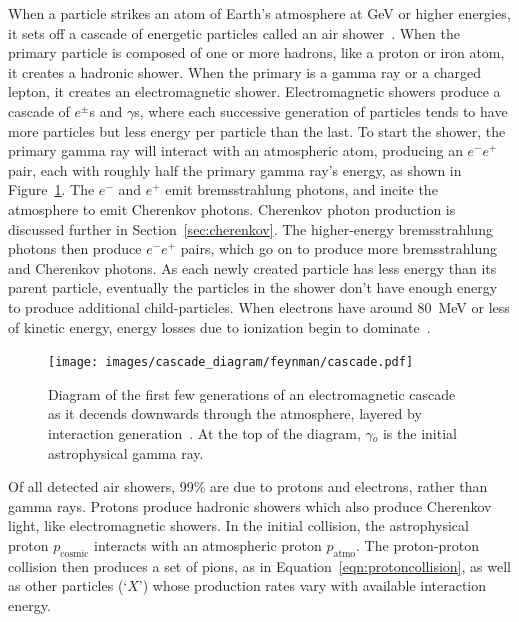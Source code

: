   When a particle strikes an atom of Earth's atmosphere at GeV or higher energies, it sets off a cascade of energetic particles called an air shower~\cite{Bethe1934,Klein1999}.
  When the primary particle is composed of one or more hadrons, like a proton or iron atom, it creates a hadronic shower.
  When the primary is a gamma ray or a charged lepton, it creates an electromagnetic shower.
  Electromagnetic showers produce a cascade of $e^{\pm}$s and $\gamma$s, where each successive generation of particles tends to have more particles but less energy per particle than the last.
  To start the shower, the primary gamma ray will interact with an atmospheric atom, producing an $e^{-}e^{+}$ pair, each with roughly half the primary gamma ray's energy, as shown in Figure~\ref{fig:emcascade}.
  The $e^{-}$ and $e^{+}$ emit bremsstrahlung photons, and incite the atmosphere to emit Cherenkov photons.
  Cherenkov photon production is discussed further in Section~\ref{sec:cherenkov}.
  The higher-energy bremsstrahlung photons then produce $e^{-}e^{+}$ pairs, which go on to produce more bremsstrahlung and Cherenkov photons.
  As each newly created particle has less energy than its parent particle, eventually the particles in the shower don't have enough energy to produce additional child-particles.
  When electrons have around \SI{80}{MeV} or less of kinetic energy, energy losses due to ionization begin to dominate~\cite{pdg_2014}.

  \begin{figure}[ht]
    \centering
    \texttt{[image: images/cascade\_diagram/feynman/cascade.pdf]}
    \caption[Electromagnetic Cascade]{
      Diagram of the first few generations of an electromagnetic cascade as it decends downwards through the atmosphere, layered by interaction generation~\cite{ellis2017tikz}.
      At the top of the diagram, $\gamma{}_o$ is the initial astrophysical gamma ray.
      \CaptionBlankLine
    }
    \label{fig:emcascade}
  \end{figure}

  Of all detected air showers, \nicetilde{}99\% are due to protons and electrons, rather than gamma rays.
  Protons produce hadronic showers which also produce Cherenkov light, like electromagnetic showers.
  In the initial collision, the astrophysical proton $p_{\textrm{cosmic}}$ interacts with an atmospheric proton $p_{\textrm{atmo}}$.
  The proton-proton collision then produces a set of pions, as in Equation~\ref{eqn:protoncollision}, as well as other particles (`$X$') whose production rates vary with available interaction energy.
  
